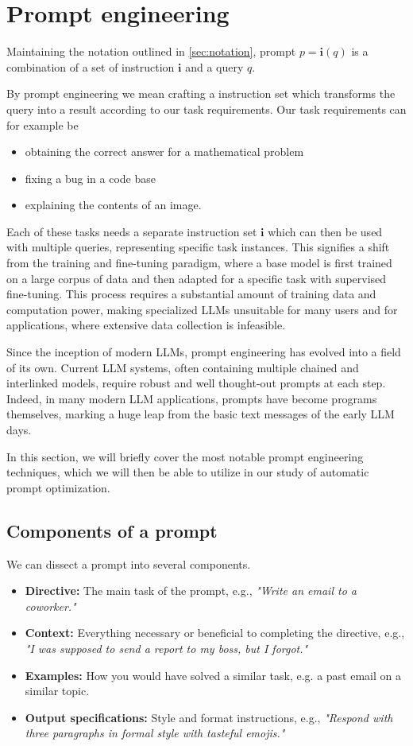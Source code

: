 \section{Prompt engineering}
Maintaining the notation outlined in \ref{sec:notation}, prompt $p = \mathbf{i}(q)$ is a combination 
of a set of instruction $\mathbf{i}$ and a query $q$. 

By prompt engineering we mean crafting a instruction set which 
transforms the query into a result according to our task requirements.
Our task requirements can for example be
\begin{itemize}
    \item obtaining the correct answer for a mathematical problem
    \item fixing a bug in a code base
    \item explaining the contents of an image.
\end{itemize}
Each of these tasks needs a separate instruction set $\mathbf{i}$ which can then be used with multiple queries,
representing specific task instances. This signifies a shift from the training and fine-tuning paradigm, where 
a base model is first trained on a large corpus of data and then adapted for a specific task with supervised fine-tuning.
This process requires a substantial amount of training data and computation power, making specialized LLMs unsuitable
for many users and for applications, where extensive data collection is infeasible.


Since the inception of modern LLMs, prompt engineering has evolved into a field of its own. Current LLM systems, often containing
multiple chained and interlinked models, require robust and well thought-out prompts at each step. 
Indeed, in many modern LLM applications, prompts have become programs themselves\cite{schnabel2024symbolicpromptprogramsearch}, 
marking a huge leap from the basic text messages of the early LLM days.

In this section, we will briefly cover the most notable prompt engineering techniques, which we will then
be able to utilize in our study of automatic prompt optimization.

\subsection{Components of a prompt}
We can dissect a prompt into several components\cite{schulhoff2024promptreportsystematicsurvey}.
\begin{itemize}
    \item \textbf{Directive:} The main task of the prompt, e.g., \textit{"Write an email to a coworker."}
    \item \textbf{Context:} Everything necessary or beneficial to completing the directive, e.g., \textit{"I was supposed to send a report to my boss, but I forgot."}
    \item \textbf{Examples:} How you would have solved a similar task, e.g. a past email on a similar topic.
    \item \textbf{Output specifications:} Style and format instructions, e.g., \textit{"Respond with three paragraphs in formal style with tasteful emojis."}
\end{itemize}

